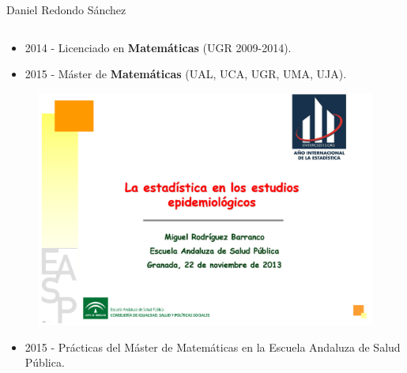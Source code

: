 \documentclass{beamer}
\begin{document}
\begin{frame}
\begin{block}{Daniel Redondo Sánchez}
\begin{columns}
\begin{column}{0.74\textwidth}
				\begin{itemize}
					\item 2014 - Licenciado en \textbf{Matemáticas} (UGR 2009-2014).
					\item 2015 - Máster de \textbf{Matemáticas} (UAL, UCA, UGR, UMA, UJA).
				\end{itemize}
			\vspace{-10pt}
				\begin{figure}
					\centering
					\includegraphics[width=.5\textwidth]{images/miguel.png}
				\end{figure}
			\vspace{-10pt}
				\begin{itemize}
					\item 2015 - Prácticas del Máster de Matemáticas en la Escuela Andaluza de Salud Pública.
				\end{itemize}

			\end{column}
		\end{columns}
	\end{block}
\end{frame}

\end{document}
